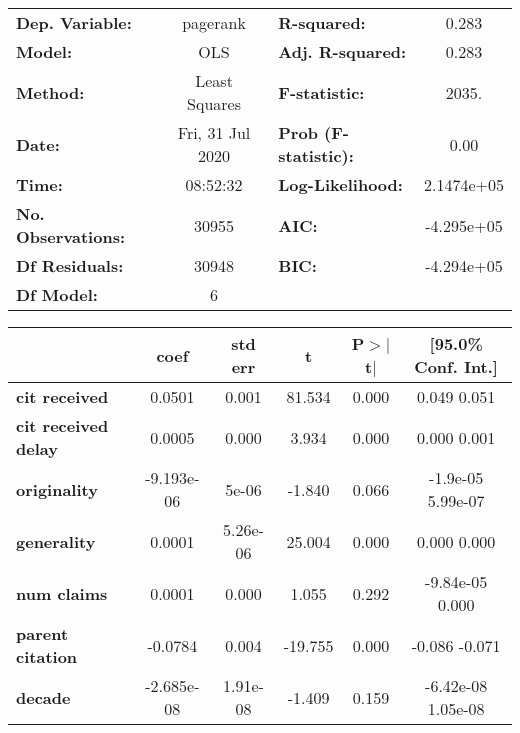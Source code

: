 \begin{center}
\begin{tabular}{lclc}
\toprule
\textbf{Dep. Variable:}     &     pagerank     & \textbf{  R-squared:         } &      0.283   \\
\textbf{Model:}             &       OLS        & \textbf{  Adj. R-squared:    } &      0.283   \\
\textbf{Method:}            &  Least Squares   & \textbf{  F-statistic:       } &      2035.   \\
\textbf{Date:}              & Fri, 31 Jul 2020 & \textbf{  Prob (F-statistic):} &      0.00    \\
\textbf{Time:}              &     08:52:32     & \textbf{  Log-Likelihood:    } &  2.1474e+05  \\
\textbf{No. Observations:}  &       30955      & \textbf{  AIC:               } &  -4.295e+05  \\
\textbf{Df Residuals:}      &       30948      & \textbf{  BIC:               } &  -4.294e+05  \\
\textbf{Df Model:}          &           6      & \textbf{                     } &              \\
\bottomrule
\end{tabular}
\begin{tabular}{lccccc}
                            & \textbf{coef} & \textbf{std err} & \textbf{t} & \textbf{P$>$$|$t$|$} & \textbf{[95.0\% Conf. Int.]}  \\
\midrule
\textbf{cit received}       &       0.0501  &        0.001     &    81.534  &         0.000        &         0.049     0.051       \\
\textbf{cit received delay} &       0.0005  &        0.000     &     3.934  &         0.000        &         0.000     0.001       \\
\textbf{originality}        &   -9.193e-06  &        5e-06     &    -1.840  &         0.066        &      -1.9e-05  5.99e-07       \\
\textbf{generality}         &       0.0001  &     5.26e-06     &    25.004  &         0.000        &         0.000     0.000       \\
\textbf{num claims}         &       0.0001  &        0.000     &     1.055  &         0.292        &     -9.84e-05     0.000       \\
\textbf{parent citation}    &      -0.0784  &        0.004     &   -19.755  &         0.000        &        -0.086    -0.071       \\
\textbf{decade}             &   -2.685e-08  &     1.91e-08     &    -1.409  &         0.159        &     -6.42e-08  1.05e-08       \\

\end{tabular}
\end{center}
